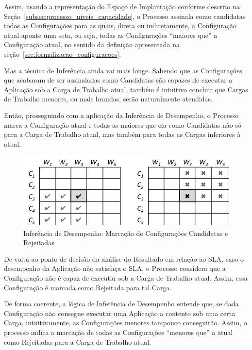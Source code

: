 Assim, usando a representação do Espaço de Implantação conforme descrito na
Seção~\ref{subsec:processo_niveis_capacidade}, o Processo assinala como candidatas
todas as Configurações para as quais, direta ou indiretamente, a Configuração 
atual aponte uma seta, ou seja, todas as Configurações ``maiores que'' a Configuração
atual, no sentido da definição apresentada na seção~\ref{sec:formalizacao_configuracoes}.

Mas a técnica de Inferência ainda vai mais longe. Sabendo que as Configurações
que acabaram de ser assinaladas como Candidatas são capazes de executar a Aplicação
sob a Carga de Trabalho atual, também é intuitivo concluir que Cargas de Trabalho 
menores, ou mais brandas, serão naturalmente atendidas.

Então, prosseguindo com a aplicação da Inferência de Desempenho, o Processo marca
a Configuração atual e todas as maiores que ela como Candidatas não só para a 
Carga de Trabalho atual, mas também para todas as Cargas inferiores à atual.

\begin{figure}[hbt]
  \caption{\label{fig:fig_processo_inferencia}Inferência de Desempenho: Marcação de Configurações Candidatas e Rejeitadas}
  \begin{center}
    \includegraphics[scale=1.00]{img/inference}
  \end{center}
\end{figure}

De volta ao ponto de decisão da análise do Resultado em relação ao SLA, caso o 
desempenho da Aplicação não satisfaça o SLA, o Processo considera que a 
Configuração não é capaz de executar sob a Carga de Trabalho atual. Assim, essa
Configuração é marcada como Rejeitada para tal Carga.

De forma coerente, a lógica de Inferência de Desempenho entende que, se dada 
Configuração não consegue executar uma Aplicação a contento sob uma certa Carga,
intuitivamente, as Configurações menores tampouco conseguirão. Assim, o processo
indica a marcação de todas as Configurações ``menores que'' a atual como 
Rejeitadas para a Carga de Trabalho atual. 

